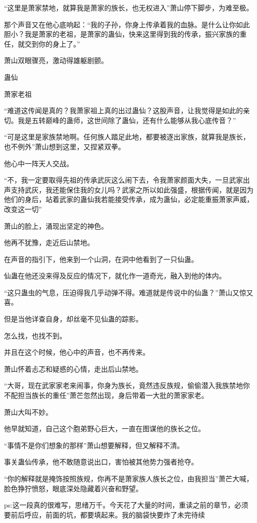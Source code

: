 \begin{this_body}
“这里是萧家禁地，就算我是萧家的族长，也无权进入”萧山停下脚步，为难至极。

那个声音又在他心底响起：“我的子孙，你身上传承着我的血脉。是什么让你如此胆小？我是萧家的老祖，是萧家的蛊仙，快来这里得到我的传承，振兴家族的重任，就交到你的身上了。”

萧山双眼骤亮，激动得雄躯剧颤。

蛊仙

萧家老祖

“难道这传闻是真的？我萧家祖上真的出过蛊仙？这股声音，让我觉得是如此的亲切。我是五转巅峰的蛊师，这世间除了蛊仙，还有什么能够从我心底传音？”

“可是这里是家族禁地啊。任何族人踏足此地，都要被逐出家族，就算我是族长，也不例外”萧山想到这里，又捏紧双拳。

他心中一阵天人交战。

“不，我一定要取得先祖的传承武灰这么闹下去，令我萧家颜面大失，一旦武家出声支持武灰，我还能保住我的女儿吗？武家之所以如此强盛，根据传闻，就是因为他们的身后，站着武家的蛊仙我若能接受传承，成为蛊仙，必定能重振萧家声威，改变这一切”

萧山的脸上，涌现出坚定的神色。

他再不犹豫，走近后山禁地。

在声音的指引下，他来到一个山洞，在洞中他看到了一只仙蛊。

仙蛊在他还没来得及反应的情况下，就化作一道奇光，融入到他的体内。

“这只蛊虫的气息，压迫得我几乎动弹不得。难道就是传说中的仙蛊？”萧山又惊又喜。

但是当他详查自身，却丝毫不见仙蛊的踪影。

怎么找，也找不到。

并且在这个时候，他心中的声音，也不再传来。

萧山怀着忐忑和疑惑的心情，走出后山禁地。

“大哥，现在武家家老来闹事，你身为族长，竟然违反族规，偷偷潜入我族禁地你不配担当族长的重任”萧芒忽然出现，身后带着一大批的萧家家老。

萧山大叫不妙。

他早就知道，自己这个胞弟野心巨大，一直在图谋他的族长之位。

“事情不是你们想象的那样”萧山想要解释，但又解释不清。

事关蛊仙传承，他不敢随意说出口，害怕被其他势力强者抢夺。

“你的解释就是掩饰按照族规，你再不是萧家族人族长之位，由我担当”萧芒大喊，脸色狰狞愤怒，眼底深处隐藏着兴奋和野望。

ps:这一段真的很难写，思绪万千。今天花了大量的时间，重读之前的章节，必须要前后呼应，前面的坑，都要填起来。我的脑袋快要炸了未完待续

\end{this_body}

